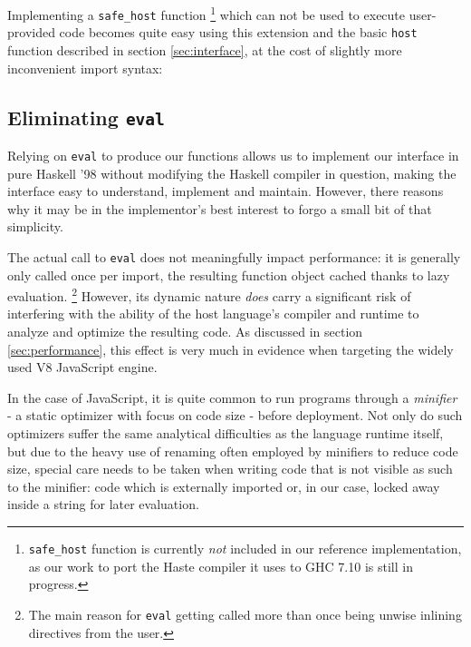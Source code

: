 \documentclass{sigplanconf}
\begin{document}
Implementing a \lstinline!safe_host! function
\footnote{
  \lstinline!safe_host! function is currently \emph{not} included in our
  reference implementation, as our work to port the Haste compiler it uses to
  GHC 7.10 is still in progress.
}
which can not be used to execute user-provided code becomes quite easy using
this extension and the basic \lstinline!host! function described in section
\ref{sec:interface}, at the cost of slightly more inconvenient import syntax:


\subsection{Eliminating \lstinline!eval!}
\label{sec:inline-eval}
Relying on \lstinline!eval! to produce our functions allows us to
implement our interface in pure Haskell '98 without modifying the Haskell
compiler in question, making the interface easy to understand, implement and
maintain. However, there reasons why it may be in the implementor's best
interest to forgo a small bit of that simplicity.

The actual call to \lstinline!eval! does not meaningfully impact
performance: it is generally only called once per import,
the resulting function object cached thanks to lazy evaluation.
\footnote{The main reason for \lstinline!eval! getting called more than once
being unwise inlining directives from the user.}
However, its dynamic nature \emph{does}
carry a significant risk of interfering with the ability of the host language's
compiler and runtime to analyze and optimize the resulting code.
As discussed in section \ref{sec:performance}, this effect is very much in
evidence when targeting the widely used V8 JavaScript engine.

In the case of JavaScript, it is quite common to run programs through a
\emph{minifier} - a static optimizer with focus on code size - before
deployment. Not only do such optimizers suffer the same analytical
difficulties as the language runtime itself, but due to the heavy use of
renaming often employed by minifiers to reduce code size, special care needs
to be taken when writing code that is not visible as such to the minifier:
code which is externally imported or, in our case, locked away inside a string
for later evaluation.
\end{document}
